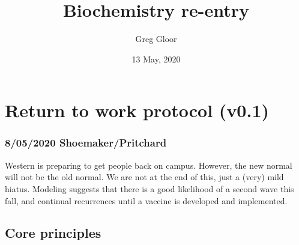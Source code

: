 \documentclass[onecolumn]{article}
\title{Biochemistry re-entry}
\author{Greg Gloor}
\date{13 May, 2020}
\begin{document}
\maketitle

\hypertarget{return-to-work-protocol-v0.1}{%
\section{Return to work protocol
(v0.1)}\label{return-to-work-protocol-v0.1}}

\hypertarget{shoemakerpritchard}{%
\subsubsection{8/05/2020 Shoemaker/Pritchard}\label{shoemakerpritchard}}

Western is preparing to get people back on campus. However, the new
normal will not be the old normal. We are not at the end of this, just a
(very) mild hiatus. Modeling suggests that there is a good likelihood of
a second wave this fall, and continual recurrences until a vaccine is
developed and implemented.

\hypertarget{core-principles}{%
\subsection{Core principles}\label{core-principles}}
\end{document}
